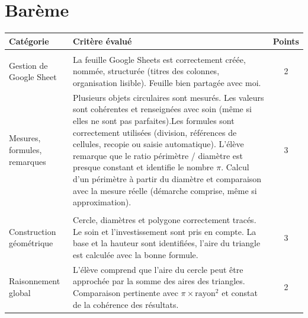 \documentclass{exam}
\begin{document}
\section{Barème}

\renewcommand{\arraystretch}{1.6}
{
\centering
\begin{longtable}{|L{0.22\textwidth}|L{0.62\textwidth}|c|}
\hline
{}
\textbf{Catégorie} & \textbf{Critère évalué} & \textbf{Points} \\[2pt]
\hline

 \\
\hline

Gestion de Google Sheet 
& La feuille Google Sheets est correctement créée, nommée, structurée (titres des colonnes, organisation lisible).
Feuille bien partagée avec moi.
& 2 \\
\hline

Mesures, formules, remarques
& Plusieurs objets circulaires sont mesurés. Les valeurs sont cohérentes et renseignées avec soin (même si elles ne sont pas parfaites).Les formules sont correctement utilisées (division, références de cellules, recopie ou saisie automatique).
L'élève remarque que le ratio périmètre / diamètre est presque constant et identifie le nombre $\pi$.
Calcul d’un périmètre à partir du diamètre et comparaison avec la mesure réelle (démarche comprise, même si approximation).
& 3 \\
\hline

 \\
\hline

Construction géométrique
& Cercle, diamètres et polygone correctement tracés. Le soin et l’investissement sont pris en compte. La base et la hauteur sont identifiées, l’aire du triangle est calculée avec la bonne formule.
& 3 \\
\hline

Raisonnement global
& L’élève comprend que l’aire du cercle peut être approchée par la somme des aires des triangles. Comparaison pertinente avec $\pi \times \text{rayon}^2$ et constat de la cohérence des résultats.
& 2 \\
\hline



\end{longtable}}
\end{document}
